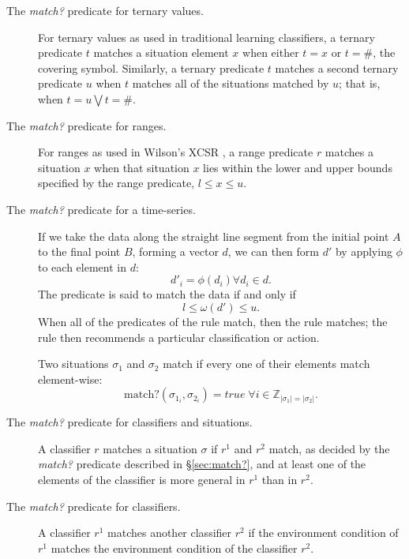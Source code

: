 \begin{description}

\item [The \emph{match?} predicate for ternary values.]
For ternary values as used in traditional learning classifiers, a ternary predicate $t$ matches a situation element $x$ when either
$t = x$ or $t = \#$, the covering symbol.
Similarly, a ternary predicate $t$ matches a second ternary predicate $u$ when $t$ matches all of the situations matched by $u$;
that is, when $t = u \bigvee t = \#$.

\item [The \emph{match?} predicate for ranges.]
For ranges as used in Wilson's XCSR \cite{WilsonXCSR}, a range predicate $r$ matches a situation $x$ when that situation $x$ lies within the lower and upper bounds specified by the range predicate, $l \le x \le u$.

\item [The \emph{match?} predicate for a time-series.]
If we take the data along the straight line segment from the initial point $A$ to the final point $B$, forming a vector $d$, we can then form $d'$ by applying $\phi$ to each element in $d$:
\begin{equation}
d'_i = \phi \left(d_i\right) \forall d_i \in d.
\end{equation}
The predicate is said to match the data if and only if
\begin{equation}
l \le \omega \left( d' \right) \le u.
\end{equation}
When all of the predicates of the rule match, then the rule matches; the rule then recommends a particular classification or action.

Two situations $\sigma_1$ and $\sigma_2$ match if every one of their elements match element-wise:
\begin{equation}
   \mathrm{match?}\left( \sigma_{1_i}, \sigma_{2_i} \right) = true \;
      \forall i \in \mathbb{Z}_{|\sigma_1| = |\sigma_2|}.
\end{equation}

\item [The \emph{match?} predicate for classifiers and situations.]
A classifier $r$ matches a situation $\sigma$
if $r^1$ and $r^2$ match,
as decided by the \emph{match?} predicate described in \S\ref{sec:match?},
and at least one of the elements of the classifier is more general in $r^1$ than in $r^2$.

\item [The \emph{match?} predicate for classifiers.]
A classifier $r^1$ matches another classifier $r^2$
if the environment condition of $r^1$ matches the environment condition of the classifier $r^2$.

\end{description}

